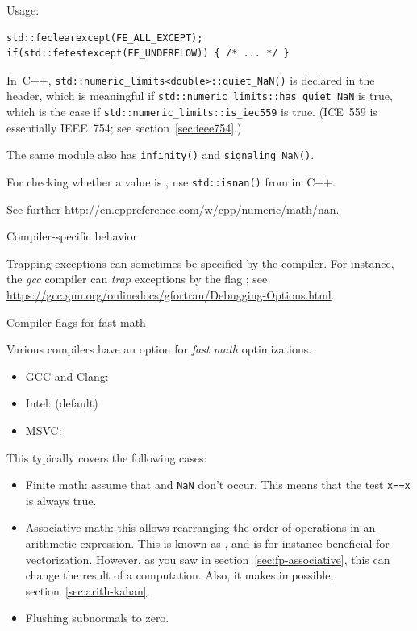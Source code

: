 Usage:

\begin{lstlisting}
std::feclearexcept(FE_ALL_EXCEPT);
if(std::fetestexcept(FE_UNDERFLOW)) { /* ... */ }
\end{lstlisting}

In~C++, \lstinline{std::numeric_limits<double>::quiet_NaN()} is declared in
the  header, which is meaningful if
\lstinline{std::numeric_limits::has_quiet_NaN} is true, which is the case if
\lstinline{std::numeric_limits::is_iec559} is true. (ICE~559 is essentially
IEEE~754; see section~\ref{sec:ieee754}.)

The same module also has \lstinline{infinity()} and \lstinline{signaling_NaN()}.

For checking whether a value is , use \lstinline{std::isnan()} from
 in~C++.

See further \url{http://en.cppreference.com/w/cpp/numeric/math/nan}.

 {Compiler-specific behavior}

Trapping exceptions can sometimes be specified by the compiler.
For instance, the \emph{gcc} compiler can
\emph{trap}
exceptions by the flag
;
see \url{https://gcc.gnu.org/onlinedocs/gfortran/Debugging-Options.html}.

 {Compiler flags for fast math}

Various compilers have an option for
\emph{fast math}
optimizations.

\begin{itemize}
\item GCC and Clang: 
\item Intel:  (default)
\item MSVC: 
\end{itemize}

This typically covers the following cases:
\begin{itemize}
\item Finite math: assume that  and \lstinline{NaN} don't occur.
  This means that the test \lstinline{x==x} is always true.
\item Associative math: this allows rearranging the order of operations
  in an arithmetic expression.
  This is known as , and is for instance
  beneficial for vectorization.
  However, as you saw in  section~\ref{sec:fp-associative},
  this can change the result of a computation.
  Also, it makes  impossible;
  section~\ref{sec:arith-kahan}.
\item Flushing subnormals to zero.
\end{itemize}

